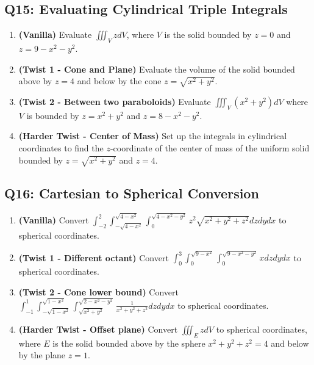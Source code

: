 \documentclass[11pt]{article}
\begin{document}
\subsection{Q15: Evaluating Cylindrical Triple Integrals}
\begin{enumerate}[label=\textbf{15\alph*.}]
    \item \textbf{(Vanilla)} Evaluate $\iiint_V z dV$, where $V$ is the solid bounded by $z = 0$ and $z = 9 - x^2 - y^2$.
    \item \textbf{(Twist 1 - Cone and Plane)} Evaluate the volume of the solid bounded above by $z = 4$ and below by the cone $z = \sqrt{x^2+y^2}$.
    \item \textbf{(Twist 2 - Between two paraboloids)} Evaluate $\iiint_V (x^2+y^2) dV$ where $V$ is bounded by $z = x^2+y^2$ and $z = 8 - x^2 - y^2$.
    \item \textbf{(Harder Twist - Center of Mass)} Set up the integrals in cylindrical coordinates to find the $z$-coordinate of the center of mass of the uniform solid bounded by $z = \sqrt{x^2+y^2}$ and $z = 4$.
\end{enumerate}

\subsection{Q16: Cartesian to Spherical Conversion}
\begin{enumerate}[label=\textbf{16\alph*.}]
    \item \textbf{(Vanilla)} Convert $\int_{-2}^2 \int_{-\sqrt{4-x^2}}^{\sqrt{4-x^2}} \int_{0}^{\sqrt{4-x^2-y^2}} z^2 \sqrt{x^2+y^2+z^2} dz dy dx$ to spherical coordinates.
    \item \textbf{(Twist 1 - Different octant)} Convert $\int_0^3 \int_0^{\sqrt{9-x^2}} \int_{0}^{\sqrt{9-x^2-y^2}} x dz dy dx$ to spherical coordinates.
    \item \textbf{(Twist 2 - Cone lower bound)} Convert $\int_{-1}^1 \int_{-\sqrt{1-x^2}}^{\sqrt{1-x^2}} \int_{\sqrt{x^2+y^2}}^{\sqrt{2-x^2-y^2}} \frac{1}{x^2+y^2+z^2} dz dy dx$ to spherical coordinates.
    \item \textbf{(Harder Twist - Offset plane)} Convert $\iiint_E z dV$ to spherical coordinates, where $E$ is the solid bounded above by the sphere $x^2+y^2+z^2=4$ and below by the plane $z=1$.
\end{enumerate}
\end{document}
